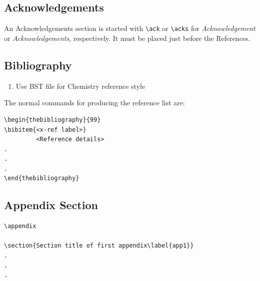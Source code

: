 \documentclass[ACS,STIX1COL]{WileyNJD-v2}
\begin{document}
\subsection{Acknowledgements} An Acknowledgements section is started with \verb"\ack" or
\verb"\acks" for \textit{Acknowledgement} or
\textit{Acknowledgements}, respectively. It must be placed just
before the References.

\subsection{Bibliography}

\begin{enumerate}[1]
\item Use \verb"" BST file for Chemistry reference style
\end{enumerate}

The normal commands for producing the reference list are:

\begin{verbatim}
\begin{thebibliography}{99}
\bibitem{<x-ref label>}
         <Reference details>
.
.
.
\end{thebibliography}
\end{verbatim}

\subsection{Appendix Section}

\begin{verbatim}
\appendix

\section{Section title of first appendix\label{app1}}
.
.
.

\end{verbatim}
\end{document}
